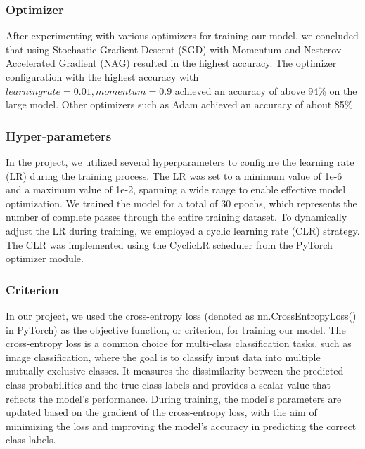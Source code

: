\documentclass[letterpaper]{article} %
\begin{document}
\subsubsection{Optimizer}
After experimenting with various optimizers for training our model, we concluded that using Stochastic Gradient Descent (SGD) with Momentum and Nesterov Accelerated Gradient (NAG) resulted in the highest accuracy. The optimizer configuration with the highest accuracy with $learning rate = 0.01, momentum = 0.9 $ achieved an accuracy of above 94\% on the large model. Other optimizers such as Adam achieved an accuracy of about 85\%.
\subsubsection{Hyper-parameters}
In the project, we utilized several hyperparameters to configure the learning rate (LR) during the training process. The LR was set to a minimum value of 1e-6 and a maximum value of 1e-2, spanning a wide range to enable effective model optimization. We trained the model for a total of 30 epochs, which represents the number of complete passes through the entire training dataset. To dynamically adjust the LR during training, we employed a cyclic learning rate (CLR) strategy. The CLR was implemented using the CyclicLR scheduler from the PyTorch optimizer module.

\subsubsection{Criterion}
In our project, we used the cross-entropy loss (denoted as nn.CrossEntropyLoss() in PyTorch) as the objective function, or criterion, for training our model. The cross-entropy loss is a common choice for multi-class classification tasks, such as image classification, where the goal is to classify input data into multiple mutually exclusive classes. It measures the dissimilarity between the predicted class probabilities and the true class labels and provides a scalar value that reflects the model's performance. During training, the model's parameters are updated based on the gradient of the cross-entropy loss, with the aim of minimizing the loss and improving the model's accuracy in predicting the correct class labels.
\end{document}
